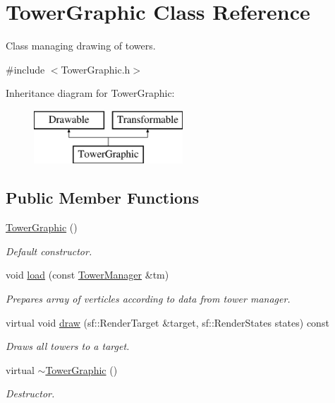 \hypertarget{class_tower_graphic}{}\section{Tower\+Graphic Class Reference}
\label{class_tower_graphic}


Class managing drawing of towers.  




{\ttfamily \#include $<$Tower\+Graphic.\+h$>$}

Inheritance diagram for Tower\+Graphic\+:\begin{figure}[H]
\begin{center}
\leavevmode
\includegraphics[height=2.000000cm]{class_tower_graphic}
\end{center}
\end{figure}
\subsection*{Public Member Functions}
\begin{DoxyCompactItemize}
\item 
\mbox{\label{class_tower_graphic_a9fabddf8db14ad2aaf42d6e8f271ca70}} 
\mbox{\hyperlink{class_tower_graphic_a9fabddf8db14ad2aaf42d6e8f271ca70}{Tower\+Graphic}} ()
\begin{DoxyCompactList}\small\item\em Default constructor. \end{DoxyCompactList}\item 
void \mbox{\hyperlink{class_tower_graphic_a74c68c198252422789d39f7428130ae6}{load}} (const \mbox{\hyperlink{class_tower_manager}{Tower\+Manager}} \&tm)
\begin{DoxyCompactList}\small\item\em Prepares array of verticles according to data from tower manager. \end{DoxyCompactList}\item 
virtual void \mbox{\hyperlink{class_tower_graphic_acf08ab592132dc2992b5b4f02f26343b}{draw}} (sf\+::\+Render\+Target \&target, sf\+::\+Render\+States states) const
\begin{DoxyCompactList}\small\item\em Draws all towers to a target. \end{DoxyCompactList}\item 
\mbox{\label{class_tower_graphic_a8f7c3e6d52c3b8a27137434c2b3ecb05}} 
virtual \mbox{\hyperlink{class_tower_graphic_a8f7c3e6d52c3b8a27137434c2b3ecb05}{$\sim$\+Tower\+Graphic}} ()
\begin{DoxyCompactList}\small\item\em Destructor. \end{DoxyCompactList}\end{DoxyCompactItemize}



